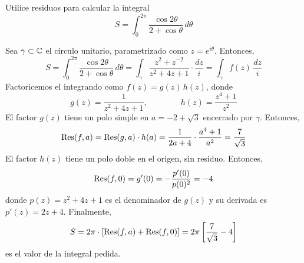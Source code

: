 \begin{exercise}
Utilice residuos para calcular la integral
$$S = \int_0^{2\pi} \frac {\cos 2\theta} {2 + \cos \theta} \, d\theta$$
\end{exercise}

\begin{solution}
Sea $\gamma \subset \mathbb C$ el círculo unitario, parametrizado como $z = e^{i\theta}$. Entonces,
$$
S
    = \int_0^{2\pi} \frac {\cos 2\theta} {2 + \cos \theta} \, d\theta
    = \int_\gamma \frac {z^2 + z^{-2}} {z^2 + 4z + 1} \cdot \frac {dz} i
    = \int_\gamma f(z) \, \frac {dz} i
$$
Factoricemos el integrando como $f(z) = g(z) \, h(z)$, donde
$$g(z) = \frac 1 {z^2 + 4z + 1}, \qquad \qquad h(z) = \frac {z^4 + 1} {z^2}$$
El factor $g(z)$ tiene un polo simple en $a = -2 + \sqrt 3$ encerrado por $\gamma$. Entonces,
$$\operatorname{Res}(f, a) = \operatorname{Res}(g, a) \cdot h(a) = \frac 1 {2a + 4} \cdot \frac {a^4 + 1} {a^2} = \frac 7 {\sqrt 3}$$
El factor $h(z)$ tiene un polo doble en el origen, sin residuo. Entonces,
$$\operatorname{Res}(f, 0) = g'(0) = -\frac {p'(0)} {p(0)^2} = -4$$
donde $p(z) = z^2 + 4z + 1$ es el denominador de $g(z)$ y su derivada es $p'(z) = 2z + 4$. Finalmente,
$$S = 2\pi \cdot [\operatorname{Res}(f, a) + \operatorname{Res}(f, 0)] = 2\pi \left[ \frac 7 {\sqrt 3} - 4 \right]$$
es el valor de la integral pedida.
\end{solution}
